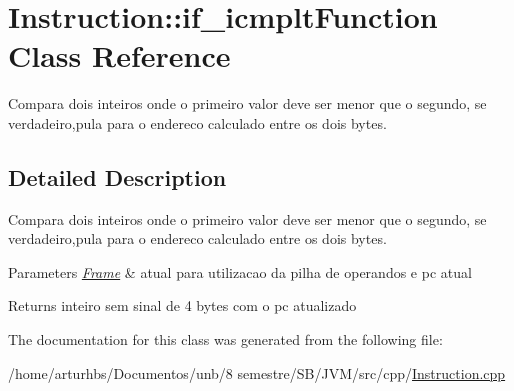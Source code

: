 \hypertarget{classInstruction_1_1if__icmpltFunction}{}\section{Instruction\+:\+:if\+\_\+icmplt\+Function Class Reference}
\label{classInstruction_1_1if__icmpltFunction}


Compara dois inteiros onde o primeiro valor deve ser menor que o segundo, se verdadeiro,pula para o endereco calculado entre os dois bytes.  




\subsection{Detailed Description}
Compara dois inteiros onde o primeiro valor deve ser menor que o segundo, se verdadeiro,pula para o endereco calculado entre os dois bytes. 


\begin{DoxyParams}{Parameters}
{\em \hyperlink{classFrame}{Frame}} & atual para utilizacao da pilha de operandos e pc atual \\
\hline
\end{DoxyParams}
\begin{DoxyReturn}{Returns}
inteiro sem sinal de 4 bytes com o pc atualizado 
\end{DoxyReturn}


The documentation for this class was generated from the following file\+:\begin{DoxyCompactItemize}
\item 
/home/arturhbs/\+Documentos/unb/8 semestre/\+S\+B/\+J\+V\+M/src/cpp/\hyperlink{Instruction_8cpp}{Instruction.\+cpp}\end{DoxyCompactItemize}

